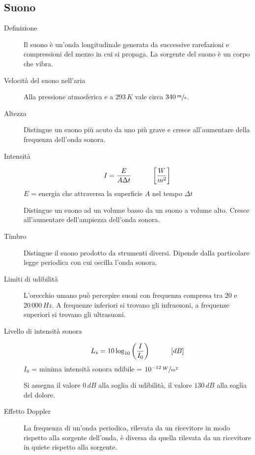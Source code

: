 \documentclass[a4paper,11pt,italian]{article}
\begin{document}
\subsection{Suono}

\begin{description}
  \item[Definizione] 
  Il suono è un'onda longitudinale generata da successive rarefazioni e compressioni del mezzo in cui si propaga. La sorgente del suono è un corpo che vibra.

  \item[Velocità del suono nell'aria] 
  Alla pressione atmosferica e a $ 293 \, K $ vale circa $ 340 \, \sfrac{m}{s} $.

  \item[Altezza] 
  Distingue un suono più acuto da uno più grave e cresce all'aumentare della frequenza dell'onda sonora.

  \item[Intensità]
  \[ I = \frac{E}{A \Delta t} \hspace*{3em} \left[ \frac{W}{m^2} \right]\]
  $ E $ = energia che attraversa la superficie $ A $ nel tempo $ \Delta t $
  
  Distingue un suono ad un volume basso da un suono a volume alto. Cresce all'aumentare dell'ampiezza dell'onda sonora.

  \item[Timbro] 
  Distingue il suono prodotto da strumenti diversi. Dipende dalla particolare legge periodica con cui oscilla l'onda sonora.

  \item[Limiti di udibilità] 
  L'orecchio umano può percepire suoni con frequenza compresa tra $ 20 $ e $ 20\, 000 \, Hz $. A frequenze inferiori si trovano gli infrasuoni, a frequenze superiori si trovano gli ultrasuoni.

  \item[Livello di intensità sonora]
  \[ L_s = 10 \log_{10} \left(\frac{I}{I_0}\right) \hspace*{3em} [dB] \]
  $ I_0 $ = minima intensità sonora udibile = $ 10^{-12} \, \sfrac{W}{m^2} $
  
  Si assegna il valore $ 0 \, dB $ alla soglia di udibilità, il valore $ 130 \, dB $ alla soglia del dolore.

  \item[Effetto Doppler] 
  La frequenza di un'onda periodica, rilevata da un ricevitore in modo rispetto alla sorgente dell'onda, è diversa da quella rilevata da un ricevitore in quiete rispetto alla sorgente.
  

\end{description}
\end{document}
